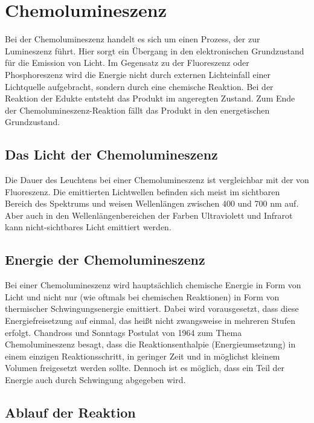 \section{Chemolumineszenz}

Bei der Chemolumineszenz handelt es sich um einen Prozess, der zur Lumineszenz führt. Hier sorgt ein Übergang in den elektronischen Grundzustand für die Emission von Licht. Im Gegensatz zu der Fluoreszenz oder Phosphoreszenz wird die Energie nicht durch externen Lichteinfall einer Lichtquelle aufgebracht, sondern durch eine chemische Reaktion.
Bei der Reaktion der Edukte entsteht das Produkt im angeregten Zustand. Zum Ende der Chemolumineszenz-Reaktion fällt das Produkt in den energetischen Grundzustand. 

\subsection{Das Licht der Chemolumineszenz}

Die Dauer des Leuchtens bei einer Chemolumineszenz ist vergleichbar mit der von Fluoreszenz. 
Die emittierten Lichtwellen befinden sich meist im sichtbaren Bereich des Spektrums und weisen Wellenlängen zwischen 400 und 700 nm auf. Aber auch in den Wellenlängenbereichen der Farben Ultraviolett und Infrarot kann nicht-sichtbares Licht emittiert werden. \cite{Doerfler}

\subsection{Energie der Chemolumineszenz}

Bei einer Chemolumineszenz wird hauptsächlich chemische Energie in Form von Licht und nicht nur (wie oftmals bei chemischen Reaktionen) in Form von thermischer Schwingungsenergie emittiert. Dabei wird vorausgesetzt, dass diese Energiefreisetzung auf einmal, das heißt nicht zwangsweise in mehreren Stufen erfolgt. Chandross und Sonntags Postulat von 1964 zum Thema Chemolumineszenz \cite{Chandross} besagt, dass die Reaktionsenthalpie (Energieumsetzung) in einem einzigen Reaktionsschritt, in geringer Zeit und in möglichst kleinem Volumen freigesetzt werden sollte.
Dennoch ist es möglich, dass ein Teil der Energie auch durch Schwingung abgegeben wird. 

\subsection{Ablauf der Reaktion}

